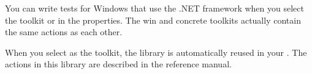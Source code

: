You can write tests for Windows \gdauts{} that use the .NET framework when you select the toolkit  or  in the \gdproject{} properties. The win and concrete toolkits actually contain the same actions as each other. 

When you select  as the \gdproject{} toolkit, the library \gdproject{}  is automatically reused in your \gdproject{}. The actions in this library are described in the reference manual.
